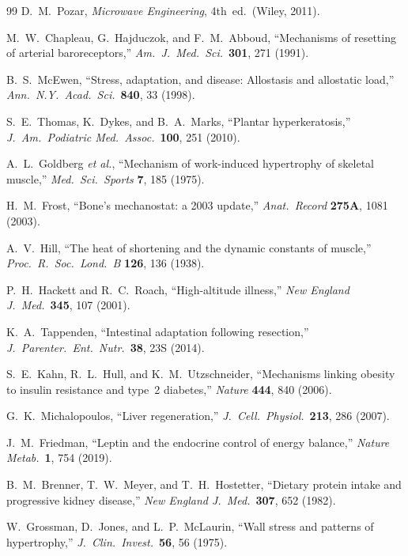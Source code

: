 \documentclass[aps,pre,twocolumn,superscriptaddress,floatfix]{revtex4-2}
\begin{document}
\begin{thebibliography}{99}
D.~M.~Pozar, \emph{Microwave Engineering}, 4th~ed.\
(Wiley, 2011).

M.~W.~Chapleau, G.~Hajduczok, and F.~M.~Abboud,
``Mechanisms of resetting of arterial baroreceptors,''
\emph{Am.\ J.\ Med.\ Sci.}\ \textbf{301}, 271 (1991).

B.~S.~McEwen, ``Stress, adaptation, and disease:
Allostasis and allostatic load,''
\emph{Ann.\ N.Y.\ Acad.\ Sci.}\ \textbf{840}, 33 (1998).

S.~E.~Thomas, K.~Dykes, and B.~A.~Marks,
``Plantar hyperkeratosis,''
\emph{J.\ Am.\ Podiatric Med.\ Assoc.}\ \textbf{100},
251 (2010).

A.~L.~Goldberg \emph{et al.},
``Mechanism of work-induced hypertrophy of skeletal muscle,''
\emph{Med.\ Sci.\ Sports} \textbf{7}, 185 (1975).

H.~M.~Frost, ``Bone's mechanostat: a 2003 update,''
\emph{Anat.\ Record} \textbf{275A}, 1081 (2003).

A.~V.~Hill, ``The heat of shortening and the dynamic
constants of muscle,''
\emph{Proc.\ R.\ Soc.\ Lond.\ B} \textbf{126}, 136 (1938).

P.~H.~Hackett and R.~C.~Roach, ``High-altitude illness,''
\emph{New England J.\ Med.}\ \textbf{345}, 107 (2001).

K.~A.~Tappenden, ``Intestinal adaptation following resection,''
\emph{J.\ Parenter.\ Ent.\ Nutr.}\ \textbf{38}, 23S (2014).

S.~E.~Kahn, R.~L.~Hull, and K.~M.~Utzschneider,
``Mechanisms linking obesity to insulin resistance
and type~2 diabetes,''
\emph{Nature} \textbf{444}, 840 (2006).

G.~K.~Michalopoulos, ``Liver regeneration,''
\emph{J.\ Cell.\ Physiol.}\ \textbf{213}, 286 (2007).

J.~M.~Friedman, ``Leptin and the endocrine control of
energy balance,''
\emph{Nature Metab.}\ \textbf{1}, 754 (2019).

B.~M.~Brenner, T.~W.~Meyer, and T.~H.~Hostetter,
``Dietary protein intake and progressive kidney disease,''
\emph{New England J.\ Med.}\ \textbf{307}, 652 (1982).

W.~Grossman, D.~Jones, and L.~P.~McLaurin,
``Wall stress and patterns of hypertrophy,''
\emph{J.\ Clin.\ Invest.}\ \textbf{56}, 56 (1975).


\end{thebibliography}
\end{document}
